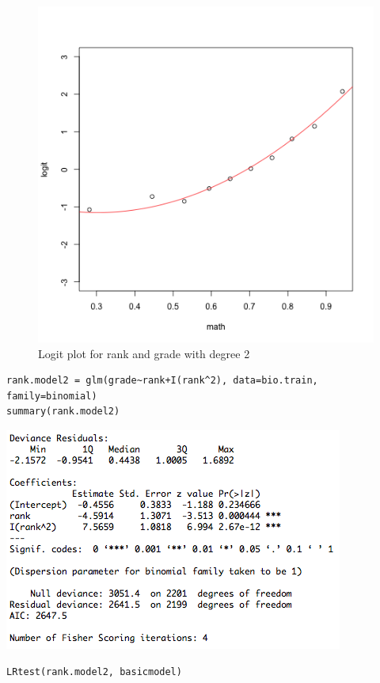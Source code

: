 \documentclass[11pt]{article}
\begin{document}
\begin{enumerate}
\begin{enumerate}
\begin{itemize}
			\begin{figure}[H]
				\caption{Logit plot for rank and grade with degree 2}
				\begin{center}
					\includegraphics[scale=0.25]{grade_rank_logit_deg2}
				\end{center}
			\end{figure}
\begin{Verbatim}
rank.model2 = glm(grade~rank+I(rank^2), data=bio.train, family=binomial)
summary(rank.model2)
\end{Verbatim}
		\begin{center}
			\includegraphics[scale=0.7]{rank_model2}
		\end{center}
\begin{Verbatim}
LRtest(rank.model2, basicmodel)
\end{Verbatim}


\end{itemize}
\end{enumerate}
\end{enumerate}
\end{document}
